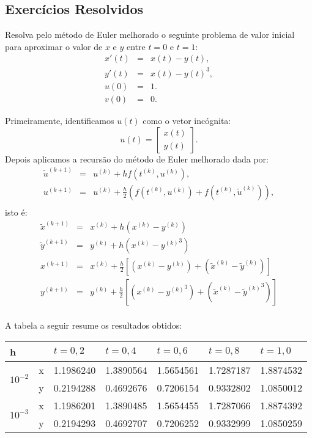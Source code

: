 \subsection*{Exercícios Resolvidos}
\begin{exeresol} Resolva pelo método de Euler melhorado o seguinte problema de valor inicial para aproximar o valor de $x$ e $y$ entre $t=0$ e $t=1$:
\begin{eqnarray}
x'(t)&=&x(t)-y(t),\\
y'(t)&=&x(t)-y(t)^3,\\
u(0)&=&1.\\
v(0)&=&0.
\end{eqnarray}
\end{exeresol}
\begin{resol}
 Primeiramente, identificamos $u(t)$ como o vetor incógnita:
 \begin{equation} u(t)=\left[\begin{array}{c}x(t)\\y(t)\end{array}\right]. \end{equation}
Depois aplicamos a recursão do método de Euler melhorado dada por:
 \begin{eqnarray}
\tilde{u}^{(k+1)}&=&u^{(k)}+hf(t^{(k)},u^{(k)}),\\
u^{(k+1)}&=&u^{(k)}+\frac{h}{2}\left(f(t^{(k)},u^{(k)})+f(t^{(k)},\tilde{u}^{(k)})\right),\\
\end{eqnarray}
isto é:
 \begin{eqnarray}
\tilde{x}^{(k+1)}&=&x^{(k)}+h\left(x^{(k)}-y^{(k)}\right)\\
\tilde{y}^{(k+1)}&=&y^{(k)}+h\left(x^{(k)}-{y^{(k)}}^3\right)\\
{x}^{(k+1)}&=&x^{(k)}+\frac{h}{2}\left[\left({x}^{(k)}-{y}^{(k)}\right)+\left(\tilde{x}^{(k)}-\tilde{y}^{(k)}\right)\right]\\
{y}^{(k+1)}&=&y^{(k)}+\frac{h}{2}\left[\left({x}^{(k)}-{{y}^{(k)}}^3\right)+ \left(\tilde{x}^{(k)}-\left.{\tilde{y}^{(k)}}\right.^3\right)\right]\\
 \end{eqnarray}

 A tabela a seguir resume os resultados obtidos:


 \begin{center}
 \begin{tabular}{|l|l|l|l|l|l|l|}%
\hline
   h&&$t=0,2$&$t=0,4$&$t=0,6$&$t=0,8$&$t=1,0$\\
   \hline
   \multirow{2}{*}{$10^{-2}$} &x  &1.1986240 &1.3890564 &1.5654561 &1.7287187 &1.8874532 \\
			       &y&0.2194288 &0.4692676 &0.7206154 &0.9332802 &1.0850012 \\
   \hline
  \multirow{2}{*}{$10^{-3}$} &x  &1.1986201 &1.3890485 &1.5654455 &1.7287066 &1.8874392\\
			       &y &0.2194293 &0.4692707 &0.7206252 &0.9332999 &1.0850259\\
			       \hline



\end{tabular}
\end{center}
\end{resol}
